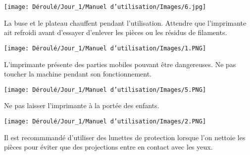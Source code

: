 \begin{multicols}{2}

\texttt{[image: Déroulé/Jour\_1/Manuel d'utilisation/Images/6.jpg]}\\

\columnbreak
\begin{flushleft}
La buse et le plateau chauffent pendant l'utilisation. Attendre que l'imprimante ait refroidi avant d'essayer d'enlever les pièces ou les résidus de filaments.\\
\end{flushleft}

\end{multicols}

\begin{multicols}{2}

\texttt{[image: Déroulé/Jour\_1/Manuel d'utilisation/Images/1.PNG]}\\

\columnbreak
\begin{flushleft}
L’imprimante présente des parties mobiles pouvant être dangereuses.
Ne pas toucher la machine pendant son fonctionnement.\\
\end{flushleft}

\end{multicols}

\begin{multicols}{2}

\texttt{[image: Déroulé/Jour\_1/Manuel d'utilisation/Images/5.PNG]}\\

\columnbreak
\begin{flushleft}
Ne pas laisser l'imprimante à la portée des enfants.
\end{flushleft}

\end{multicols}

\begin{multicols}{2}

\texttt{[image: Déroulé/Jour\_1/Manuel d'utilisation/Images/2.PNG]}\\

\columnbreak
\begin{flushleft}
Il est recommmandé d'utiliser des lunettes de protection lorsque l'on nettoie les pièces pour éviter que des projections entre en contact avec les yeux.\\
\end{flushleft}

\end{multicols}

